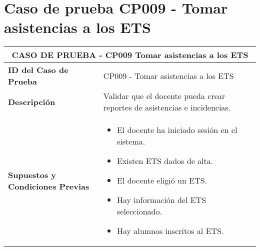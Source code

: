 \section{Caso de prueba CP009 - Tomar asistencias a los ETS}

\begin{longtable}{|p{5cm}|p{10cm}|}
	\hline
	\multicolumn{2}{|c|}{\textbf{CASO DE PRUEBA - CP009 Tomar asistencias a los ETS}} \\
	\hline
	\textbf{ID del Caso de Prueba} & CP009 - Tomar asistencias a los ETS \\
	\hline
	\textbf{Descripción} & Validar que el docente pueda crear reportes de asistencias e incidencias. \\
	\hline
	\textbf{Supuestos y Condiciones Previas} & 
	\begin{itemize}
		\item El docente ha iniciado sesión en el sistema.
		\item Existen ETS dados de alta.
		\item El docente eligió un ETS.
		\item Hay información del ETS seleccionado.
		\item Hay alumnos inscritos al ETS.
		

\end{itemize}
\end{longtable}
